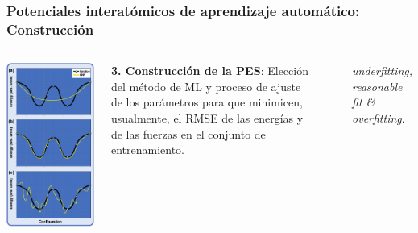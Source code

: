 \documentclass[aspectratio=169]{beamer}
\let\oldtextbf\textbf
\renewcommand{\textbf}[1]{\textcolor{nordblue}{\oldtextbf{#1}}}
\begin{document}
    \begin{frame}
        \frametitle{Potenciales interatómicos de aprendizaje automático: Construcción}

        \begin{columns}
            \begin{center}
                \includegraphics[width=0.65\columnwidth]{intro-fitting.png}
            \end{center}

            \textbf{3. Construcción de la PES}: Elección del método de ML y 
            proceso de ajuste de los parámetros para que minimicen, usualmente, 
            el RMSE de las energías y de las fuerzas en el conjunto de 
            entrenamiento.

            \

            \textit{underfitting, reasonable fit \& overfitting}.
        \end{columns}

	\end{frame}
    
\end{document}

